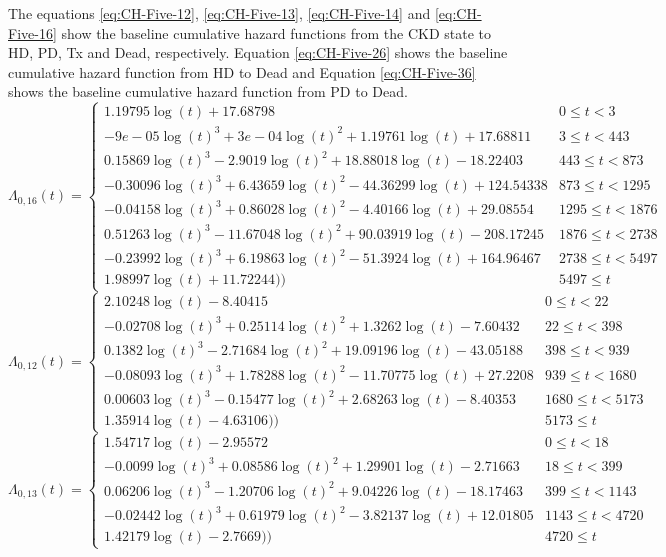 \documentclass[
]{article}
\begin{document}
The equations \eqref{eq:CH-Five-12}, \eqref{eq:CH-Five-13}, \eqref{eq:CH-Five-14} and \eqref{eq:CH-Five-16} show the baseline cumulative hazard functions from the CKD state to HD, PD, Tx and Dead, respectively. Equation \eqref{eq:CH-Five-26} shows the baseline cumulative hazard function from HD to Dead and Equation \eqref{eq:CH-Five-36} shows the baseline cumulative hazard function from PD to Dead.
\begin{equation}
\Lambda_{0,16}(t)=\begin{cases} 1.19795\log(t)+17.68798 & 0 \le t < 3 \\ -9e-05\log(t)^3+3e-04\log(t)^2+1.19761\log(t)+17.68811 & 3 \le t < 443 \\ 0.15869\log(t)^3-2.9019\log(t)^2+18.88018\log(t)-18.22403 & 443 \le t < 873 \\ -0.30096\log(t)^3+6.43659\log(t)^2-44.36299\log(t)+124.54338 & 873 \le t < 1295 \\ -0.04158\log(t)^3+0.86028\log(t)^2-4.40166\log(t)+29.08554 & 1295 \le t < 1876 \\ 0.51263\log(t)^3-11.67048\log(t)^2+90.03919\log(t)-208.17245 & 1876 \le t < 2738 \\ -0.23992\log(t)^3+6.19863\log(t)^2-51.3924\log(t)+164.96467 & 2738 \le t < 5497 \\ 1.98997\log(t)+11.72244)) & 5497 \le t \label{eq:CH-Five-16}\end{cases}
\end{equation}
\begin{equation}
\Lambda_{0,12}(t)=\begin{cases} 2.10248\log(t)-8.40415 & 0 \le t < 22 \\ -0.02708\log(t)^3+0.25114\log(t)^2+1.3262\log(t)-7.60432 & 22 \le t < 398 \\ 0.1382\log(t)^3-2.71684\log(t)^2+19.09196\log(t)-43.05188 & 398 \le t < 939 \\ -0.08093\log(t)^3+1.78288\log(t)^2-11.70775\log(t)+27.2208 & 939 \le t < 1680 \\ 0.00603\log(t)^3-0.15477\log(t)^2+2.68263\log(t)-8.40353 & 1680 \le t < 5173 \\ 1.35914\log(t)-4.63106)) & 5173 \le t \label{eq:CH-Five-12}\end{cases}
\end{equation}
\begin{equation}
\Lambda_{0,13}(t)=\begin{cases} 1.54717\log(t)-2.95572 & 0 \le t < 18 \\ -0.0099\log(t)^3+0.08586\log(t)^2+1.29901\log(t)-2.71663 & 18 \le t < 399 \\ 0.06206\log(t)^3-1.20706\log(t)^2+9.04226\log(t)-18.17463 & 399 \le t < 1143 \\ -0.02442\log(t)^3+0.61979\log(t)^2-3.82137\log(t)+12.01805 & 1143 \le t < 4720 \\ 1.42179\log(t)-2.7669)) & 4720 \le t \label{eq:CH-Five-13}\end{cases}
\end{equation}
\end{document}

